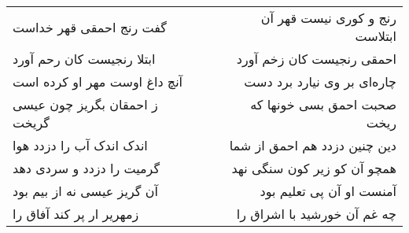 \begin{center}
\begin{longtable}{l p{0.5cm} r}
گفت رنج احمقی قهر خداست
&&
رنج و کوری نیست قهر آن ابتلاست
\\
ابتلا رنجیست کان رحم آورد
&&
احمقی رنجیست کان زخم آورد
\\
آنچ داغ اوست مهر او کرده است
&&
چاره‌ای بر وی نیارد برد دست
\\
ز احمقان بگریز چون عیسی گریخت
&&
صحبت احمق بسی خونها که ریخت
\\
اندک اندک آب را دزدد هوا
&&
دین چنین دزدد هم احمق از شما
\\
گرمیت را دزدد و سردی دهد
&&
همچو آن کو زیر کون سنگی نهد
\\
آن گریز عیسی نه از بیم بود
&&
آمنست او آن پی تعلیم بود
\\
زمهریر ار پر کند آفاق را
&&
چه غم آن خورشید با اشراق را
\\
\end{longtable}
\end{center}
